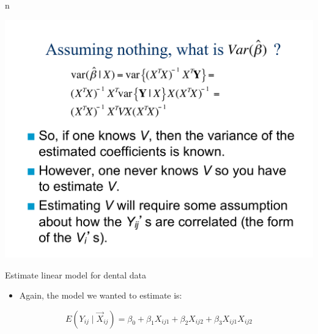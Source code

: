 \documentclass[ignorenonframetext,]{beamer}
\providecommand{\tightlist}{%
  \setlength{\itemsep}{0pt}\setlength{\parskip}{0pt}}
\begin{document}
\begin{frame}{n}

\includegraphics[page=15,width=5.5in]{Chapter5AddSlides1.pdf}

\end{frame}

\begin{frame}{Estimate linear model for dental data}

\begin{itemize}
\tightlist
\item
  Again, the model we wanted to estimate is:
\end{itemize}

\[ E(Y_{ij} \mid \vec{X}_{ij}) = \beta_0 +\beta_1 X_{ij1}+\beta_2 X_{ij2} + \beta_3 X_{ij1}X_{ij2} \]

\end{frame}
\end{document}
